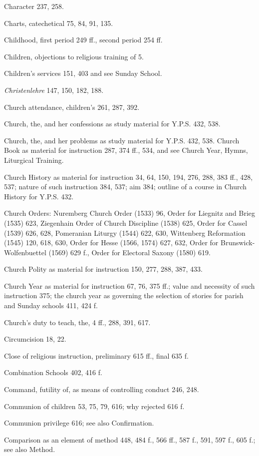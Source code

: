 Character 237, 258.

Charts, catechetical 75, 84, 91, 135.

Childhood, first period 249 ff., second period 254 ff.

Children, objections to religious training of 5.

Children’s services 151, 403 and see Sunday School.

\emph{Christenlehre} 147, 150, 182, 188.

Church attendance, children’s 261, 287, 392.

Church, the, and her confessions as study material for Y.P.S. 432, 538.

Church, the, and her problems as study material for Y.P.S. 432, 538. Church Book as material for instruction 287, 374 ff., 534, and see Church Year, Hymns, Liturgical Training.

Church History as material for instruction 34, 64, 150, 194, 276, 288, 383 ff., 428, 537; nature of such instruction 384, 537; aim 384; outline of a course in Church History for Y.P.S. 432.

Church Orders: Nuremberg Church Order (1533) 96, Order for Liegnitz and Brieg (1535) 623, Ziegenhain Order of Church Discipline (1538) 625, Order for Cassel (1539) 626, 628, Pomeranian Liturgy (1544) 622, 630, Wittenberg Reformation (1545) 120, 618, 630, Order for Hesse (1566, 1574) 627, 632, Order for Brunswick-Wolfenbuettel (1569) 629 f., Order for Electoral Saxony (1580) 619.

Church Polity as material for instruction 150, 277, 288, 387, 433.

Church Year as material for instruction 67, 76, 375 ff.; value and necessity of such instruction 375; the church year as governing the selection of stories for parish and Sunday schools 411, 424 f.

Church’s duty to teach, the, 4 ff., 288, 391, 617.

Circumcision 18, 22.

Close of religious instruction, preliminary 615 ff., final 635 f.

Combination Schools 402, 416 f.

Command, futility of, as means of controlling conduct 246, 248.

Communion of children 53, 75, 79, 616; why rejected 616 f.

Communion privilege 616; see also Confirmation.

Comparison as an element of method 448, 484 f., 566 ff., 587 f., 591, 597 f., 605 f.; see also Method.

